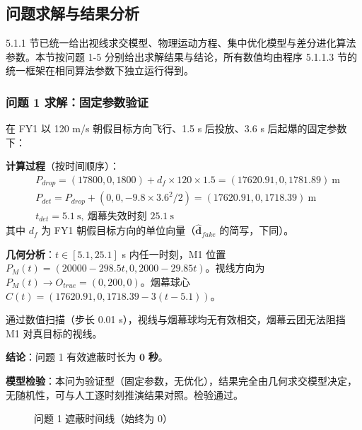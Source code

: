 \subsection{问题求解与结果分析}


5.1.1 节已统一给出视线求交模型、物理运动方程、集中优化模型与差分进化算法参数。本节按问题 1-5 分别给出求解结果与结论，所有数值均由程序 5.1.1.3 节的统一框架在相同算法参数下独立运行得到。

\subsubsection{问题 1 求解：固定参数验证}

在 FY1 以 120 m/s 朝假目标方向飞行、1.5 s 后投放、3.6 s 后起爆的固定参数下：

\textbf{计算过程}（按时间顺序）：
\begin{align*}
  &P_{drop} = (17800, 0, 1800) + d_f \times 120 \times 1.5 = (17620.91, 0, 1781.89)~\mathrm{m} \\
  &P_{det} = P_{drop} + (0, 0, -9.8 \times 3.6^2 / 2) = (17620.91, 0, 1718.39)~\mathrm{m} \\
  &t_{det} = 5.1~\mathrm{s},\ \text{烟幕失效时刻 } 25.1~\mathrm{s}
\end{align*}
其中 $d_f$ 为 FY1 朝假目标方向的单位向量（$\hat{\mathbf{d}}_{fake}$ 的简写，下同）。

\textbf{几何分析}：$t \in [5.1, 25.1]$ s 内任一时刻，M1 位置 $P_M(t) = (20000 - 298.5t, 0, 2000 - 29.85t)$。视线方向为 $P_M(t) \to O_{true} = (0, 200, 0)$。烟幕球心 $C(t) = (17620.91, 0, 1718.39 - 3(t - 5.1))$。

通过数值扫描（步长 0.01 s），视线与烟幕球均无有效相交，烟幕云团无法阻挡 M1 对真目标的视线。

\textbf{结论}：问题 1 有效遮蔽时长为 $\mathbf{0}$ \textbf{秒}。

\textbf{模型检验}：本问为验证型（固定参数，无优化），结果完全由几何求交模型决定，无随机性，可与人工逐时刻推演结果对照。检验通过。

\begin{figure}[ht]
  \centering
  \caption{问题 1 遮蔽时间线（始终为 0）}
  \label{fig:p1_timeline}
\end{figure}

